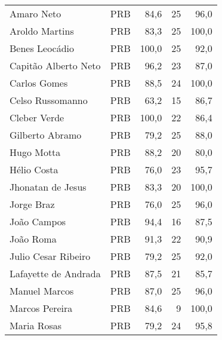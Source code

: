 \begin{longtable}{llrrr}
                          Amaro Neto &            PRB &      84,6 &           25 &       96,0 \\
                      Aroldo Martins &            PRB &      83,3 &           25 &      100,0 \\
                      Benes Leocádio &            PRB &     100,0 &           25 &       92,0 \\
                Capitão Alberto Neto &            PRB &      96,2 &           23 &       87,0 \\
                        Carlos Gomes &            PRB &      88,5 &           24 &      100,0 \\
                    Celso Russomanno &            PRB &      63,2 &           15 &       86,7 \\
                        Cleber Verde &            PRB &     100,0 &           22 &       86,4 \\
                     Gilberto Abramo &            PRB &      79,2 &           25 &       88,0 \\
                          Hugo Motta &            PRB &      88,2 &           20 &       80,0 \\
                         Hélio Costa &            PRB &      76,0 &           23 &       95,7 \\
                   Jhonatan de Jesus &            PRB &      83,3 &           20 &      100,0 \\
                          Jorge Braz &            PRB &      76,0 &           25 &       96,0 \\
                         João Campos &            PRB &      94,4 &           16 &       87,5 \\
                           João Roma &            PRB &      91,3 &           22 &       90,9 \\
                 Julio Cesar Ribeiro &            PRB &      79,2 &           25 &       92,0 \\
                Lafayette de Andrada &            PRB &      87,5 &           21 &       85,7 \\
                       Manuel Marcos &            PRB &      87,0 &           25 &       96,0 \\
                      Marcos Pereira &            PRB &      84,6 &            9 &      100,0 \\
                         Maria Rosas &            PRB &      79,2 &           24 &       95,8 \\

\end{longtable}
